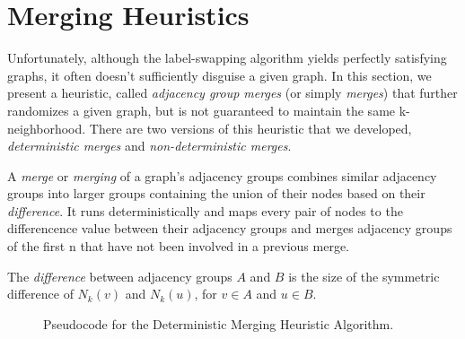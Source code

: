 \section{Merging Heuristics}
\indent Unfortunately, although the label-swapping algorithm yields perfectly satisfying graphs, it often doesn't sufficiently disguise a given graph.  In this section, we present a heuristic, called \emph{adjacency group merges} (or simply \emph{merges}) that further randomizes a given graph, but is not guaranteed to maintain the same k-neighborhood. There are two versions of this heuristic that we developed, \emph{deterministic merges} and \emph{non-deterministic merges}.

\begin{dfn}
\noindent A \emph{merge} or \emph{merging} of a graph's adjacency groups combines similar adjacency groups into larger groups containing the union of their nodes based on their \emph{difference}. It runs deterministically and maps every pair of nodes to  the differencence value between their adjacency groups and merges adjacency groups of the first n that have not been involved in a previous merge.
\end{dfn}

\begin{dfn}
The \emph{difference} between adjacency groups $A$ and $B$ is the size of the symmetric difference of $N_k(v)$ and $N_k(u)$, for $v \in A$ and $u \in B$. 
\end{dfn}

\begin{figure}[htb]
	\begin{algorithmic}
		\renewcommand{\algorithmicrequire}{\textbf{Input:}}
		\renewcommand{\algorithmicensure}{\textbf{Output:}}
			\EndFor
		\EndFor
		\EndFor
			\EndIf
		\EndIf
	\end{algorithmic}
	\caption{Pseudocode for the Deterministic Merging Heuristic Algorithm.}
	\label{fig:deterministic-merging}
\end{figure}

